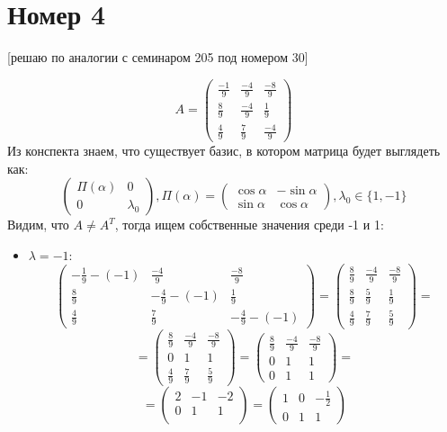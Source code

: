 \documentclass[a4paper,12pt]{article}
\begin{document}
\section*{Номер 4}
\begin{center}
[решаю по аналогии с семинаром 205 под номером 30]
\end{center}
\[
A = \left(\begin{matrix}
\frac{-1}{9} & \frac{-4}{9} & \frac{-8}{9} \\
\frac{8}{9} & \frac{-4}{9} & \frac{1}{9} \\
\frac{4}{9} & \frac{7}{9} & \frac{-4}{9}
\end{matrix}\right)
\]
Из конспекта знаем, что существует базис, в котором матрица будет выглядеть как:
\[
\begin{pmatrix}
\Pi(\alpha) & 0 \\
0 & \lambda_0 
\end{pmatrix}, \Pi(\alpha) = \begin{pmatrix}
\cos \alpha & - \sin \alpha \\
\sin \alpha & \cos \alpha
\end{pmatrix}, \lambda_0 \in \{1, -1\}
\]
Видим, что $A \neq A^T$, тогда ищем собственные значения среди -1 и 1:
\begin{itemize}
\item $\lambda = -1$:
\[
\left(\begin{matrix}
-\frac{1}{9} - (-1) & \frac{-4}{9} & \frac{-8}{9} \\
\frac{8}{9} & -\frac{4}{9} - (-1)& \frac{1}{9} \\
\frac{4}{9} & \frac{7}{9} & -\frac{4}{9} - (-1) 
\end{matrix}\right) = \left(\begin{matrix}
\frac89 & \frac{-4}{9} & \frac{-8}{9} \\
\frac{8}{9} & \frac59& \frac{1}{9} \\
\frac{4}{9} & \frac{7}{9} & \frac59
\end{matrix}\right)  =
\]
\[
=\left(\begin{matrix}
\frac{8}{9} & \frac{-4}{9} & \frac{-8}{9} \\
0 & 1 & 1 \\
\frac{4}{9} & \frac{7}{9} & \frac{5}{9}
\end{matrix}\right) = \left(\begin{matrix}
\frac{8}{9} & \frac{-4}{9} & \frac{-8}{9} \\
0 & 1 & 1 \\
0 & 1 & 1
\end{matrix}\right) = 
\]
\[
=
\left(\begin{matrix}
2 & -1 & -2 \\
0 & 1 & 1 \\
\end{matrix}\right)
=
\begin{pmatrix}
1 & 0 & -\frac12 \\0 & 1 & 1
\end{pmatrix}
\]
\end{itemize}
\end{document}
